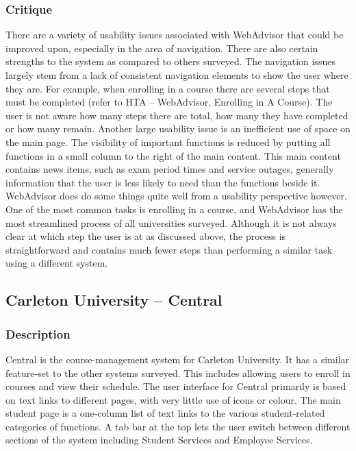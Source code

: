 \documentclass[10pt]{article}
\begin{document}
\begin{multicols}{2}
\subsubsection*{Critique}
There are a variety of usability issues associated with \mbox{WebAdvisor} that 
could be improved upon, especially in the area of navigation. There are also 
certain strengths to the system as compared to others surveyed. The navigation 
issues largely stem from a lack of consistent navigation elements to show the 
user where they are. For example, when enrolling in a course there are several 
steps that must be completed (refer to HTA -- WebAdvisor, Enrolling in A 
Course). The user is not aware how many steps there are total, how many they 
have completed or how many remain. Another large usability issue is an 
inefficient use of space on the main page. The visibility of important functions 
is reduced by putting all functions in a small column to the right of the main 
content. This main content contains news items, such as exam period times and 
service outages, generally information that the user is less likely to need than 
the functions beside it.\\

WebAdvisor does do some things quite well from a usability perspective however. 
One of the most common tasks is enrolling in a course, and WebAdvisor has the 
most streamlined process of all universities surveyed. Although it is not always 
clear at which step the user is at as discussed above, the process is 
straightforward and contains much fewer steps than performing a similar task 
using a different system.

\subsection*{Carleton University -- Central}
\subsubsection*{Description}
Central is the course-management system for Carleton University. It has a 
similar feature-set to the other systems surveyed. This includes allowing users 
to enroll in courses and view their schedule. The user interface for Central 
primarily is based on text links to different pages, with very little use of 
icons or colour. The main student page is a one-column list of text links to the 
various student-related categories of functions. A tab bar at the top lets the 
user switch between different sections of the system including Student Services 
and Employee Services.\\


\end{multicols}
\end{document}
